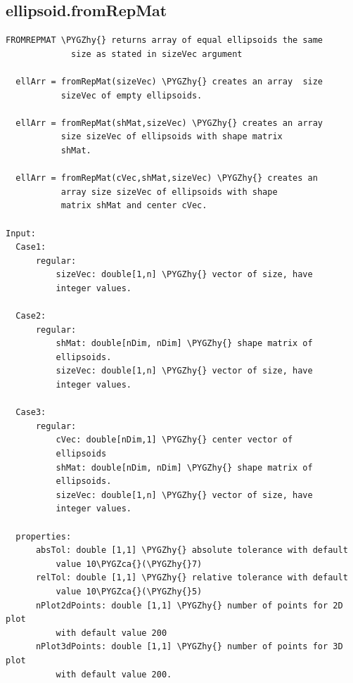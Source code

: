 \documentclass[letterpaper,10pt,english]{sphinxmanual}
\def\PYGZca{\char`\^}
\def\PYGZhy{\char`\-}
\begin{document}
\subsection{ellipsoid.fromRepMat}
\label{chap_functions:ellipsoid-fromrepmat}
\begin{Verbatim}[commandchars=\\\{\}]
FROMREPMAT \PYGZhy{} returns array of equal ellipsoids the same
             size as stated in sizeVec argument

  ellArr = fromRepMat(sizeVec) \PYGZhy{} creates an array  size
           sizeVec of empty ellipsoids.

  ellArr = fromRepMat(shMat,sizeVec) \PYGZhy{} creates an array
           size sizeVec of ellipsoids with shape matrix
           shMat.

  ellArr = fromRepMat(cVec,shMat,sizeVec) \PYGZhy{} creates an
           array size sizeVec of ellipsoids with shape
           matrix shMat and center cVec.

Input:
  Case1:
      regular:
          sizeVec: double[1,n] \PYGZhy{} vector of size, have
          integer values.

  Case2:
      regular:
          shMat: double[nDim, nDim] \PYGZhy{} shape matrix of
          ellipsoids.
          sizeVec: double[1,n] \PYGZhy{} vector of size, have
          integer values.

  Case3:
      regular:
          cVec: double[nDim,1] \PYGZhy{} center vector of
          ellipsoids
          shMat: double[nDim, nDim] \PYGZhy{} shape matrix of
          ellipsoids.
          sizeVec: double[1,n] \PYGZhy{} vector of size, have
          integer values.

  properties:
      absTol: double [1,1] \PYGZhy{} absolute tolerance with default
          value 10\PYGZca{}(\PYGZhy{}7)
      relTol: double [1,1] \PYGZhy{} relative tolerance with default
          value 10\PYGZca{}(\PYGZhy{}5)
      nPlot2dPoints: double [1,1] \PYGZhy{} number of points for 2D plot
          with default value 200
      nPlot3dPoints: double [1,1] \PYGZhy{} number of points for 3D plot
          with default value 200.
\end{Verbatim}
\end{document}
